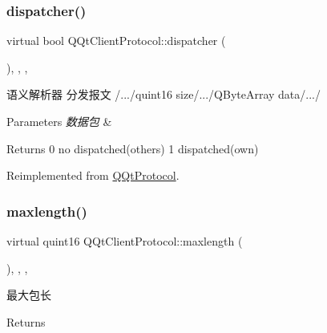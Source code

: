 \subsubsection{\texorpdfstring{dispatcher()}{dispatcher()}}
{\footnotesize\ttfamily virtual bool Q\+Qt\+Client\+Protocol\+::dispatcher (\begin{DoxyParamCaption}\item[{const Q\+Byte\+Array \&}]{ }\end{DoxyParamCaption})\hspace{0.3cm}{\ttfamily [inline]}, {\ttfamily [override]}, {\ttfamily [protected]}, {\ttfamily [virtual]}}



语义解析器 分发报文 /.../quint16 size/.../\+Q\+Byte\+Array data/.../ 


\begin{DoxyParams}{Parameters}
{\em 数据包} & \\
\hline
\end{DoxyParams}
\begin{DoxyReturn}{Returns}
0 no dispatched(others) 1 dispatched(own) 
\end{DoxyReturn}


Reimplemented from \mbox{\hyperlink{class_q_qt_protocol_a35a69c4b89c8cf7459038f40d75e0dc9}{Q\+Qt\+Protocol}}.

\mbox{\label{class_q_qt_client_protocol_aef8469f25fb684299845abc64d9b1107}} 
\subsubsection{\texorpdfstring{maxlength()}{maxlength()}}
{\footnotesize\ttfamily virtual quint16 Q\+Qt\+Client\+Protocol\+::maxlength (\begin{DoxyParamCaption}{ }\end{DoxyParamCaption})\hspace{0.3cm}{\ttfamily [inline]}, {\ttfamily [override]}, {\ttfamily [protected]}, {\ttfamily [virtual]}}



最大包长 

\begin{DoxyReturn}{Returns}

\end{DoxyReturn}


